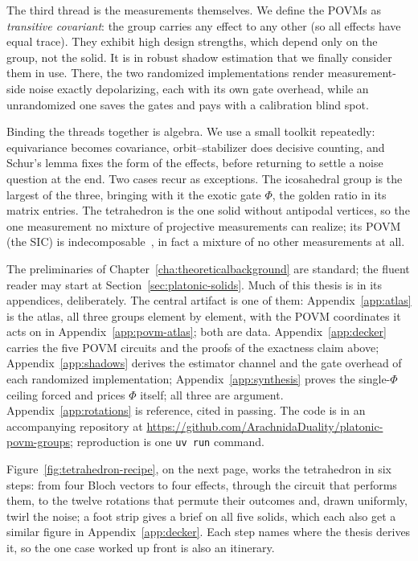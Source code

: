 \documentclass[11pt, oneside, openany]{scrbook}
\begin{document}
The third thread is the measurements themselves. We define the POVMs as \textit{transitive covariant}: the group carries any effect to any other (so all effects have equal trace). They exhibit high design strengths, which depend only on the group, not the solid. It is in robust shadow estimation that we finally consider them in use. There, the two randomized implementations render measurement-side noise exactly depolarizing, each with its own gate overhead, while an unrandomized one saves the gates and pays with a calibration blind spot.

Binding the threads together is algebra. We use a small toolkit repeatedly: equivariance becomes covariance, orbit--stabilizer does decisive counting, and Schur's lemma fixes the form of the effects, before returning to settle a noise question at the end. Two cases recur as exceptions. The icosahedral group is the largest of the three, bringing with it the exotic gate $\Phi$, the golden ratio in its matrix entries. The tetrahedron is the one solid without antipodal vertices, so the one measurement no mixture of projective measurements can realize; its POVM (the SIC) is indecomposable~\cite{dariano2005classicalrandomnessquantum}, in fact a mixture of no other measurements at all. 

The preliminaries of Chapter~\ref{cha:theoreticalbackground} are standard; the fluent reader may start at Section~\ref{sec:platonic-solids}. Much of this thesis is in its appendices, deliberately. The central artifact is one of them: Appendix~\ref{app:atlas} is the atlas, all three groups element by element, with the POVM coordinates it acts on in Appendix~\ref{app:povm-atlas}; both are data. Appendix~\ref{app:decker} carries the five POVM circuits and the proofs of the exactness claim above; Appendix~\ref{app:shadows} derives the estimator channel and the gate overhead of each randomized implementation; Appendix~\ref{app:synthesis} proves the single-$\Phi$ ceiling forced and prices $\Phi$ itself; all three are argument. Appendix~\ref{app:rotations} is reference, cited in passing. The code is in an accompanying repository at \url{https://github.com/ArachnidaDuality/platonic-povm-groups}; reproduction is one \texttt{uv run} command.

Figure~\ref{fig:tetrahedron-recipe}, on the next page, works the tetrahedron in six steps: from four Bloch vectors to four effects, through the circuit that performs them, to the twelve rotations that permute their outcomes and, drawn uniformly, twirl the noise; a foot strip gives a brief on all five solids, which each also get a similar figure in Appendix~\ref{app:decker}. Each step names where the thesis derives it, so the one case worked up front is also an itinerary.
\end{document}
